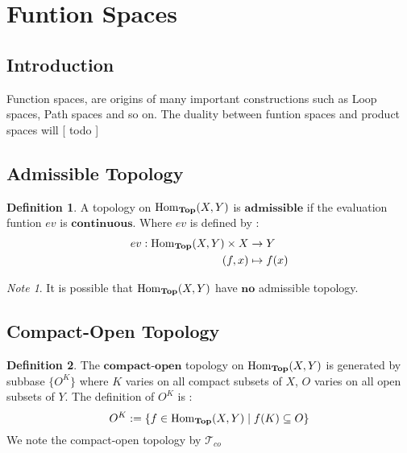 \documentclass[a4paper]{article}
\theoremstyle{plain}
\theoremstyle{definition}
\newtheorem{defn}{Definition}[section]
\theoremstyle{remark}
\newtheorem*{note}{Note}
\newcommand{\mc}[1]{\mathcal{#1}}
\newcommand{\mbf}[1]{\mathbf{#1}}
\newcommand{\mcT}{\mc T}
\DeclareMathOperator{\Homtop}{\rm{Hom}_{\mbf{Top}}}
\begin{document}
    \section{Funtion Spaces}

    \setcounter{subsection}{-1}

    \subsection{Introduction}

    Function spaces, are origins of many important constructions such as
    Loop spaces, Path spaces and so on.
    The duality between funtion spaces and product spaces will [ todo ]

    \subsection{Admissible Topology}

    \begin{defn}
        A topology on $\Homtop(X, Y)$ is $\mbf{admissible}$ if 
        the evaluation funtion $ev$ is $\mbf{continuous}$. Where $ev$ is defined by : 
        \begin{align*}
            ev  : \Homtop(X,Y) \times X & \to Y \\
            (f, x)& \mapsto f(x)
        \end{align*}
    \end{defn}

    \begin{note}
        It is possible that $\Homtop(X,Y)$ have $\mbf{no}$ admissible topology.
    \end{note}

    \subsection{Compact-Open Topology}

    \begin{defn}
        The $\mbf{compact\text{-}open}$ topology on $\Homtop(X,Y)$ is generated by 
        subbase $\{O^K\}$ where $K$ varies on all compact subsets of $X$, 
        $O$ varies on all open subsets of $Y$. 
        The definition of $O^K$ is :
        $$ O^K := \{ f \in \Homtop(X,Y) \mid f(K) \subseteq O \} $$
        We note the compact-open topology by $\mcT_{co}$
    \end{defn}
\end{document}
